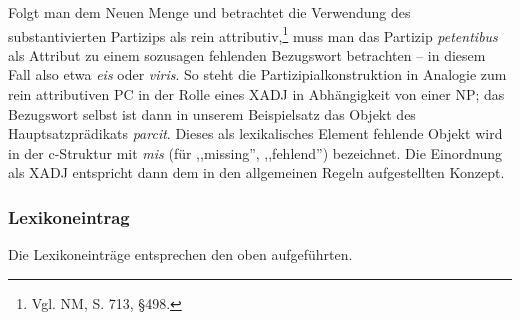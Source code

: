 \documentclass[12pt,a4paper]{article}
\begin{document}
Folgt man dem Neuen Menge und betrachtet die Verwendung des substantivierten Partizips als rein attributiv,\footnote{Vgl. NM, S. 713, §498.} muss man das Partizip \textit{petentibus} als Attribut zu einem sozusagen fehlenden Bezugswort betrachten -- in diesem Fall also etwa \textit{eis} oder \textit{viris}. So steht die Partizipialkonstruktion in Analogie zum rein attributiven PC in der Rolle eines XADJ in Abhängigkeit von einer NP; das Bezugswort selbst ist dann in unserem Beispielsatz das Objekt des Hauptsatzprädikats \textit{parcit}. Dieses als lexikalisches Element fehlende Objekt wird in der c-Struktur mit \textit{mis} (für ,,missing'', ,,fehlend'') bezeichnet.  
Die Einordnung als XADJ entspricht dann dem in den allgemeinen Regeln aufgestellten Konzept.

\subsubsection{Lexikoneintrag}
Die Lexikoneinträge entsprechen den oben aufgeführten.
\newline
\newline
\end{document}
